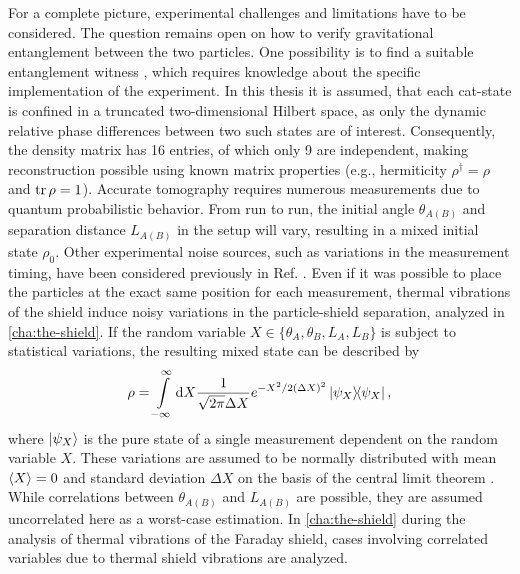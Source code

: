 For a complete picture, experimental challenges and limitations have to be considered. 
The question remains open on how to verify gravitational entanglement between the two particles.
One possibility is to find a suitable entanglement witness \cite{Bose_2017,Chevalier_2020}, which requires knowledge about the specific implementation of the experiment.
In this thesis it is assumed, that each cat-state is confined in a truncated two-dimensional Hilbert space, as only the dynamic relative phase differences between two such states are of interest.
Consequently, the density matrix has 16 entries, of which only 9 are independent, making reconstruction possible using known matrix properties (e.g., hermiticity $\rho^\dagger = \rho$ and $\tr \rho = 1$).
Accurate tomography requires numerous measurements due to quantum probabilistic behavior. 
From run to run, the initial angle $\theta_{A(B)}$ and separation distance $L_{A(B)}$ in the setup will vary, resulting in a mixed initial state $\rho_0$.
Other experimental noise sources, such as variations in the measurement timing, have been considered previously in Ref. \cite{Nguyen_2020}.
Even if it was possible to place the particles at the exact same position for each measurement, thermal vibrations of the shield induce noisy variations in the particle-shield separation, analyzed in \cref{cha:the-shield}.
If the random variable $X \in \{\theta_{A}, \theta_{B}, L_{A}, L_{B}\}$ is subject to statistical variations, the resulting mixed state can be described by
\begin{equation}
  \rho = \int\limits_{-\infty}^{\infty} \dd X \frac{1}{\sqrt{2\pi}\Delta X} e^{-X^2/2(\Delta X)^2} \ketbra{\psi_X} ,
\end{equation}
where $\ket{\psi_X}$ is the pure state of a single measurement dependent on the random variable $X$.
These variations are assumed to be normally distributed with mean $\left\langle X\right\rangle = 0$ and standard deviation $\Delta X$ on the basis of the central limit theorem \cite[p. 1195]{Riley_2018}.
While correlations between $\theta_{A(B)}$ and $L_{A(B)}$ are possible, they are assumed uncorrelated here as a worst-case estimation.
In \cref{cha:the-shield} during the analysis of thermal vibrations of the Faraday shield, cases involving correlated variables due to thermal shield vibrations are analyzed.



